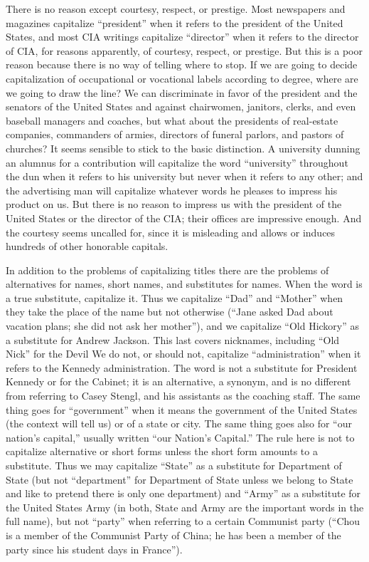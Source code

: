 \documentclass[
    oneside,
    11pt,
]{memoir}
\begin{document}
There is no reason except courtesy, respect, or prestige. Most newspapers and magazines capitalize \enquote{president} when it refers to the president of the United States, and most CIA writings capitalize \enquote{director} when it refers to the director of CIA, for reasons apparently, of courtesy, respect, or prestige. But this is a poor reason because there is no way of telling where to stop. If we are going to decide capitalization of occupational or vocational labels according to degree, where are we going to draw the line? We can discriminate in favor of the president and the senators of the United States and against chairwomen, janitors, clerks, and even baseball managers and coaches, but what about the presidents of real-estate companies, commanders of armies, directors of funeral parlors, and pastors of churches? It seems sensible to stick to the basic distinction. A university dunning an alumnus for a contribution will capitalize the word \enquote{university} throughout the dun when it refers to his university but never when it refers to any other; and the advertising man will capitalize whatever words he pleases to impress his product on us. But there is no reason to impress us with the president of the United States or the director of the CIA; their offices are impressive enough. And the courtesy seems uncalled for, since it is misleading and allows or induces hundreds of other honorable capitals.

In addition to the problems of capitalizing titles there are the problems of alternatives for names, short names, and substitutes for names. When the word is a true substitute, capitalize it. Thus we capitalize \enquote{Dad} and \enquote{Mother} when they take the place of the name but not otherwise (\enquote{Jane asked Dad about vacation plans; she did not ask her mother}), and we capitalize \enquote{Old Hickory} as a substitute for Andrew Jackson. This last covers nicknames, including \enquote{Old Nick} for the Devil We do not, or should not, capitalize \enquote{administration} when it refers to the Kennedy administration. The word is not a substitute for President Kennedy or for the Cabinet; it is an alternative, a synonym, and is no different from referring to Casey Stengl, and his assistants as the coaching staff. The same thing goes for \enquote{government} when it means the government of the United States (the context will tell us) or of a state or city. The same thing goes also for \enquote{our nation's capital,} usually written \enquote{our Nation's Capital.} The rule here is not to capitalize alternative or short forms unless the short form amounts to a substitute. Thus we may capitalize \enquote{State} as a substitute for Department of State (but not \enquote{department} for Department of State unless we belong to State and like to pretend there is only one department) and \enquote{Army} as a substitute for the United States Army (in both, State and Army are the important words in the full name), but not \enquote{party} when referring to a certain Communist party (\enquote{Chou is a member of the Communist Party of China; he has been a member of the party since his student days in France}).
\end{document}
